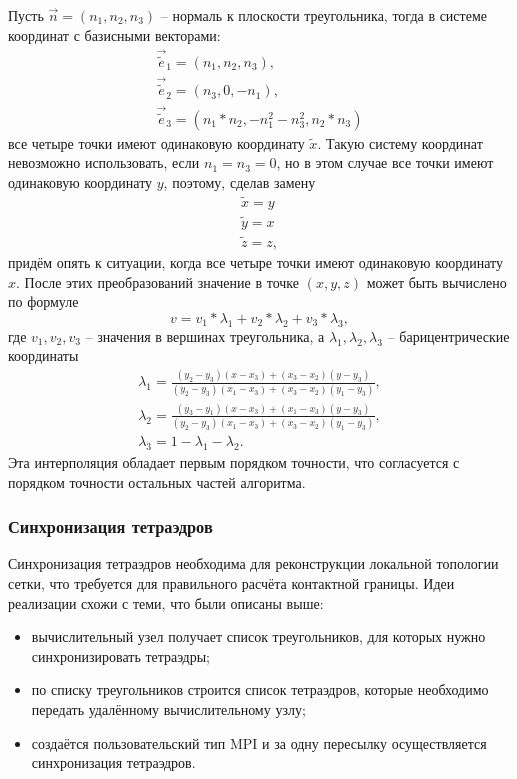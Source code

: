 Пусть $\vec{n}=(n_1,n_2,n_3)$ -- нормаль к плоскости треугольника, тогда в системе координат с базисными векторами:
\begin{eqnarray}
\label{eq:new_coords}
\vec{\tilde{e}}_1=(n_1, n_2, n_3), \nonumber \\
\vec{\tilde{e}}_2=(n_3, 0, -n_1), \nonumber \\
\vec{\tilde{e}}_3=(n_1*n_2, -n_1^2-n_3^2, n_2*n_3)
\end{eqnarray}
все четыре точки имеют одинаковую координату $\tilde{x}$. Такую систему
координат невозможно использовать, если $n_1=n_3=0$, но в этом случае все точки
имеют одинаковую координату $y$, поэтому, сделав замену
\begin{eqnarray}
\label{eq:new_coords_2}
\tilde{x}=y \\
\tilde{y}=x \nonumber \\
\tilde{z}=z,
\end{eqnarray}
придём опять к ситуации, когда все четыре точки имеют одинаковую координату $x$.
После этих преобразований значение в точке $(x,y,z)$ может быть вычислено по формуле
\begin{equation}
\label{eq:triangle_interpolation}
v=v_1*\lambda_1+v_2*\lambda_2+v_3*\lambda_3, 
\end{equation}
где $v_1,v_2,v_3$ -- значения в вершинах треугольника, а $\lambda_1,\lambda_2,\lambda_3$ -- барицентрические координаты
\begin{eqnarray}
\label{eq:barycentric_coords}
\lambda_1=\frac{(y_2-y_3)(x-x_3)+(x_3-x_2)(y-y_3)}{(y_2-y_3)(x_1-x_3)+(x_3-x_2)(y_1-y_3)}, \nonumber \\
\lambda_2=\frac{(y_3-y_1)(x-x_3)+(x_1-x_3)(y-y_3)}{(y_2-y_3)(x_1-x_3)+(x_3-x_2)(y_1-y_3)}, \nonumber \\
\lambda_3=1-\lambda_1-\lambda_2.
\end{eqnarray}
Эта интерполяция обладает первым порядком точности, что согласуется с порядком точности остальных частей алгоритма.
\subsubsection{Синхронизация тетраэдров}
Синхронизация тетраэдров необходима для реконструкции локальной топологии сетки, что требуется для правильного расчёта контактной границы. Идеи реализации схожи с теми, что были описаны выше:
\begin{itemize}
	\item вычислительный узел получает список треугольников, для которых нужно синхронизировать тетраэдры;
	\item по списку треугольников строится список тетраэдров, которые необходимо передать удалённому вычислительному узлу;
	\item создаётся пользовательский тип MPI и за одну пересылку осуществляется синхронизация тетраэдров.
\end{itemize}
